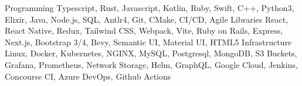 \begin{cvskills}
  \cvskill
    {Programming}
    {Typescript, Rust, Javascript, Kotlin, Ruby, Swift, C++, Python3, Elixir, Java, Node.js, SQL, Antlr4, Git, CMake, CI/CD, Agile}
  \cvskill
    {Libraries}
    {React, React Native, Redux, Tailwind CSS, Webpack, Vite, Ruby on Rails, Express, Next.js, Bootstrap 3/4, Bevy, Semantic UI, Material UI, HTML5}
  \cvskill
    {Infrastructure}
    {Linux, Docker, Kubernetes, NGINX, MySQL, Postgresql, MongoDB, S3 Buckets, Grafana, Prometheus, Network Storage, Helm, GraphQL, Google Cloud, Jenkins, Concourse CI, Azure DevOps, Github Actions}
\end{cvskills}
